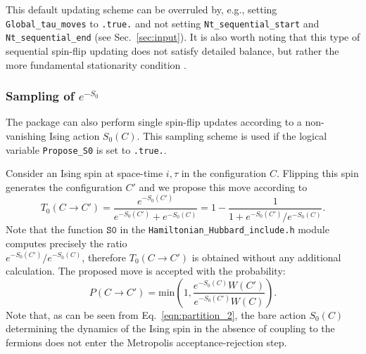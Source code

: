 This default updating scheme can be overruled by, e.g., setting \texttt{Global\_tau\_moves} to \texttt{.true.} and not setting \texttt{Nt\_sequential\_start} and \texttt{Nt\_sequential\_end} (see Sec.~\ref{sec:input}).
It is also worth noting that this type of sequential spin-flip updating does not satisfy detailed balance, but rather the more fundamental stationarity condition \cite{Sokal89}. 


% 
\subsubsection{Sampling of $e^{-S_0}$}
\label{sec:S0}
% 
The package can also perform single spin-flip updates according to a non-vanishing Ising action $S_0(C)$. This sampling scheme is used if the logical variable \texttt{Propose\_S0} is set to \texttt{.true.}.

Consider an Ising spin at space-time $i,\tau$ in the configuration $C$. Flipping this spin generates the configuration $C'$ and we propose this move according to 
  \begin{equation}
 T_0(C \rightarrow C')  =  \frac{e^{-S_0(C')}}{ e^{-S_0(C')} + e^{-S_0(C)} }   = 1 - \frac{1}{1 +  e^{-S_0(C')} /e^{-S_0(C)}}.
  \end{equation}
 Note that the function $\texttt{S0}$ in the  \texttt{Hamiltonian\_Hubbard\_include.h}  module  computes precisely the ratio\\
 ${e^{-S_0(C')} /e^{-S_0(C)}}$, therefore $T_0(C \rightarrow C') $ is obtained without any additional calculation. 
 The proposed move is accepted with the probability: 
 \begin{equation}
 P(C \rightarrow C') =  \text{min}  \left( 1,  \frac{e^{-S_0(C)}   W(C')}{ e^{-S_0(C')} W(C)} \right).
 \end{equation}
 Note that, as can be seen from Eq.~\eqref{eqn:partition_2}, the bare action $S_0(C)$  determining the  dynamics of the Ising spin  in the absence of coupling to the fermions  does not enter the Metropolis acceptance-rejection step.
% 
% 

